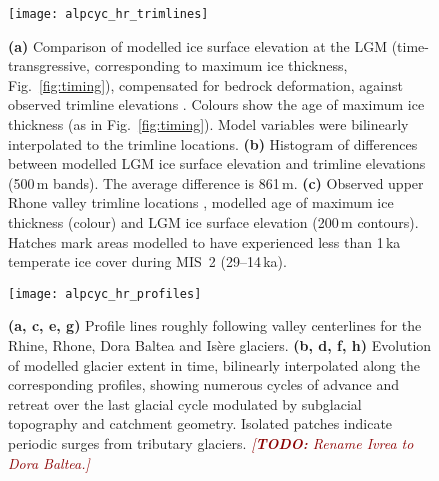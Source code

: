 \documentclass[tc, manuscript]{copernicus}
\newcommand{\todo}[1]{\textcolor{darkred}{\emph{[\textbf{TODO:} #1]}}}
\begin{document}
    \begin{figure}
      \centerline{\texttt{[image: alpcyc\_hr\_trimlines]}}
      \caption{%
        \textbf{(a)} Comparison of modelled ice surface elevation at the LGM
        (time-transgressive, corresponding to maximum ice thickness,
        Fig.~\ref{fig:timing}), compensated for bedrock deformation, against
        observed trimline elevations \citep[Table~1]{Kelly.etal.2004}. Colours
        show the age of maximum ice thickness (as in Fig.~\ref{fig:timing}).
        Model variables were bilinearly interpolated to the trimline locations.
        \textbf{(b)} Histogram of differences between modelled LGM ice surface
        elevation and trimline elevations (500\,m bands). The average
        difference is 861\,m.
        \textbf{(c)} Observed upper Rhone valley trimline locations
        \citep[Table~1]{Kelly.etal.2004}, modelled age of maximum ice thickness
        (colour) and LGM ice surface elevation (200\,m contours). Hatches
        mark areas modelled to have experienced less than 1\,ka temperate ice
        cover during MIS~2 (29--14\,ka).}
      \label{fig:trimlines}
    \end{figure}

    \begin{figure*}
      \centerline{\texttt{[image: alpcyc\_hr\_profiles]}}
      \caption{%
        \textbf{(a, c, e, g)} Profile lines roughly following valley
        centerlines for the Rhine, Rhone, Dora Baltea and Isère glaciers.
        \textbf{(b, d, f, h)} Evolution of modelled glacier extent in time,
        bilinearly interpolated along the corresponding profiles, showing
        numerous cycles of advance and retreat over the last glacial cycle
        modulated by subglacial topography and catchment geometry.
        Isolated patches indicate periodic surges from tributary glaciers.
        \todo{Rename Ivrea to Dora Baltea.}}
      \label{fig:profiles}
    \end{figure*}


\clearpage
\end{document}
